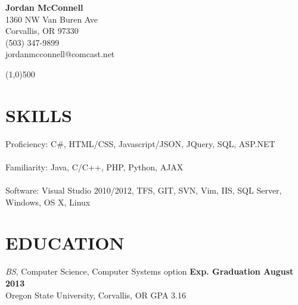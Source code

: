 \documentclass{res}
\begin{document}
\begin{resume}
\vspace{-36pt}
{\centering
{\Large \bf Jordan McConnell} \\
1360 NW Van Buren Ave \\
Corvallis, OR 97330 \\
(503) 347-9899 \\
jordanmcconnell@comcast.net
\par
}
\vspace{-12pt}
\begin{center}
\line(1,0){500}
\end{center}

\section{SKILLS}
\vspace{8pt}
Proficiency: C\#, HTML/CSS, Javascript/JSON, JQuery, SQL, ASP.NET
\\
\\
Familiarity: Java, C/C++, PHP, Python, AJAX
\\
\\
Software: Visual Studio 2010/2012, TFS, GIT, SVN, Vim, IIS, SQL Server, Windows, OS X, Linux

\vspace{0.2in}
\section{EDUCATION}
\vspace{8pt}
{\sl BS}, Computer Science, Computer Systems option \hfill{\bf Exp. Graduation August 2013}\\
Oregon State University, Corvallis, OR \hfill GPA 3.16 \\


\end{resume}
\end{document}
